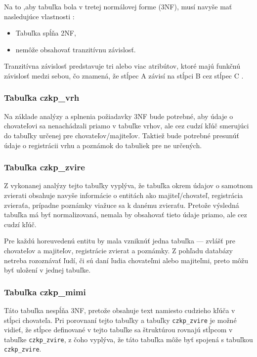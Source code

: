 Na to ,aby tabuľka bola v tretej normálovej forme (3NF), musí navyše mať nasledujúce vlastnosti \cite{typy-normalizacie}:
\begin{itemize}
	\item Tabuľka spĺňa 2NF,
	\item nemôže obsahovať tranzitívnu závislosť.
\end{itemize}

Tranzitívna závislosť predstavuje tri alebo viac atribútov, ktoré majú funkčnú závislosť medzi sebou, čo znamená, že stĺpec A závisí na stĺpci B cez stĺpec C \cite{tranzitivna-zavislost}.

\subsubsection*{Tabuľka czkp\_vrh}
Na základe analýzy a splnenia požiadavky 3NF bude potrebné, aby údaje o chovateľovi sa nenachádzali priamo v tabuľke vrhov, ale cez cudzí kľúč smerujúci do tabuľky určenej pre chovateľov/majiteľov.
Taktiež bude potrebné presunúť údaje o registrácii vrhu a poznámok do tabuliek pre ne určených.

\subsubsection*{Tabuľka czkp\_zvire}
Z vykonanej analýzy tejto tabuľky vyplýva, že tabuľka okrem údajov o samotnom zvierati obsahuje navyše informácie o entitách ako majiteľ/chovateľ, registrácia zvieraťa, prípadne poznámky viažuce sa k danému zvieraťu. Pretože výsledná tabuľka má byť normalizovaná, nemala by obsahovať tieto údaje priamo, ale cez cudzí kľúč.

Pre každú horeuvedenú entitu by mala vzniknúť jedna tabuľka --- zvlášť pre chovateľov a majiteľov, registrácie zvierat a poznámky. Z pohľadu databázy netreba rozoznávať ľudí, či sú daní ľudia chovateľmi alebo majiteľmi, preto môžu byť uložení v jednej tabuľke.

\subsubsection*{Tabuľka czkp\_mimi}
Táto tabuľka nespĺňa 3NF, pretože obsahuje text namiesto cudzieho kľúča v stĺpci chovateľa.
Pri porovnaní tejto tabuľky a tabuľky \texttt{czkp_zvire} je možné vidieť, že stĺpce definované v tejto tabuľke sa štruktúrou rovnajú stĺpcom v tabuľke \texttt{czkp_zvire}, z čoho vyplýva, že táto tabuľka môže byť spojená s tabuľkou \texttt{czkp_zvire}.

